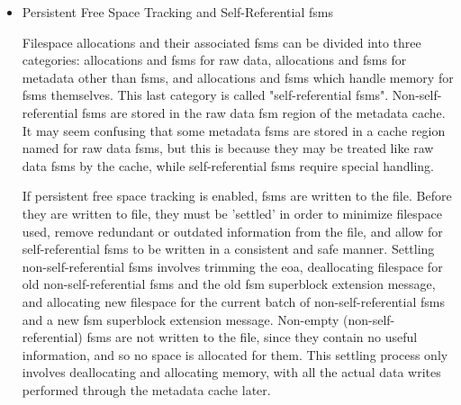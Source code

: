 \begin{itemize}
For a file with a contiguous address space, the default behavior is to use two small \Glspl{fsm} (one for raw data and one for metadata) and one large \Gls{fsm} (for all large allocations, regardless of whether they are raw data or metadata). For a file with non-contiguous address space, it is possible to have up to 6 small \Glspl{fsm} and 6 large \Glspl{fsm}. These correspond to the six file space types: raw data and five types of metadata.

    \item Persistent Free Space Tracking and Self-Referential \glspl{fsm}

Filespace allocations and their associated \Glspl{fsm} can be divided into three categories: allocations and \Glspl{fsm} for raw data, allocations and \Glspl{fsm} for metadata other than \Glspl{fsm}, and allocations and \Glspl{fsm} which handle memory for \Glspl{fsm} themselves. This last category is called "self-referential \Glspl{fsm}". Non-self-referential \Glspl{fsm} are stored in the raw data \Gls{fsm} region of the metadata cache. It may seem confusing that some metadata \Glspl{fsm} are stored in a cache region named for raw data \Glspl{fsm}, but this is because they may be treated like raw data \Glspl{fsm} by the cache, while self-referential \Glspl{fsm} require special handling.

If persistent free space tracking is enabled, \Glspl{fsm} are written to the file. Before they are written to file, they must be 'settled' in order to minimize filespace used, remove redundant or outdated information from the file, and allow for self-referential \Glspl{fsm} to be written in a consistent and safe manner. Settling non-self-referential \Glspl{fsm} involves trimming the \gls{eoa}, deallocating filespace for old non-self-referential \Glspl{fsm} and the old \Gls{fsm} superblock extension message, and allocating new filespace for the current batch of non-self-referential \Glspl{fsm} and a new \Gls{fsm} superblock extension message. Non-empty (non-self-referential) \Glspl{fsm} are not written to the file, since they contain no useful information, and so no space is allocated for them. This settling process only involves deallocating and allocating memory, with all the actual data writes performed through the metadata cache later.


\end{itemize}

